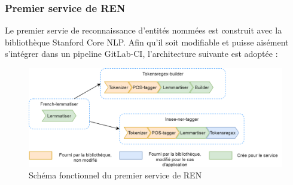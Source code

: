 \subsubsection{Premier service de REN}
Le premier servie de reconnaissance d'entités nommées est construit avec la bibliothèque Stanford Core NLP. Afin qu'il soit modifiable et puisse aisément s'intégrer dans un pipeline GitLab-CI, l'architecture suivante est adoptée :

\begin{figure}[H]
    \centering
    \includegraphics[scale=0.38]{images/Concept-tagger.png}
    \caption{Schéma fonctionnel du premier service de REN}
    \label{fig:premier-pipeline}
\end{figure}
\vspace{10pt}


